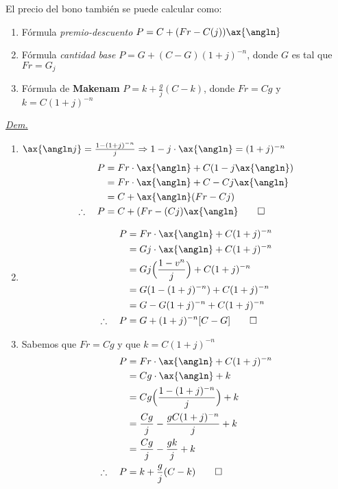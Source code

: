 \begin{proposition}
El precio del bono también se puede calcular como:
\begin{enumerate}
    \item Fórmula \textit{premio-descuento} $P=C+(Fr-C(j))\ax{\angln}$
    \item Fórmula \textit{cantidad base} $P=G + (C-G)(1+j)^{-n}$, donde $G$ es tal que $Fr=G_j$
    \item Fórmula de \textbf{Makenam} $P=k+\frac{g}{j}(C-k)$, donde $Fr=Cg$ y $k=C(1+j)^{-n}$
\end{enumerate}
\end{proposition}
\textit{\underline{Dem.}}
\begin{enumerate}
    \item $\ax{\angln j} = \frac{1-(1+j)^{-n}}{j} \Rightarrow 1-j\cdot\ax{\angln} = (1+j)^{-n}$
    \begin{align*}
        P &= Fr\cdot\ax{\angln} + C(1-j\ax{\angln})\\
         &= Fr\cdot\ax{\angln} + C - Cj\ax{\angln}\\
         &= C + \ax{\angln}(Fr-Cj)\\
         \therefore\quad P &= C+ (Fr-(Cj)\ax{\angln}\qed
    \end{align*}
    \item \begin{align*}
        P &= Fr\cdot\ax{\angln} + C(1+j)^{-n}\\
        &= Gj\cdot \ax{\angln} + C(1+j)^{-n}\\
        &= Gj\Big(\frac{1-v^n}{j}\Big) + C(1+j)^{-n}\\
        &= G(1-(1+j)^{-n}) + C(1+j)^{-n}\\
        &= G - G(1+j)^{-n} + C(1+j)^{-n}\\
        \therefore\quad P &= G + (1+j)^{-n}[C-G]\qed
    \end{align*}
    \item Sabemos que $Fr = Cg$ y que $k=C(1+j)^{-n}$\begin{align*}
        P &= Fr\cdot\ax{\angln} + C(1+j)^{-n}\\
        &= Cg\cdot\ax{\angln} + k \\
        &= Cg\Big(\frac{1-(1+j)^{-n}}{j}\Big) + k\\
        &= \frac{Cg}{j} - \frac{gC(1+j)^{-n}}{j}+k\\
        &= \frac{Cg}{j} - \frac{gk}{j} + k\\
        \therefore\quad P &= k + \frac{g}{j}(C-k)\qed
    \end{align*}
\end{enumerate}

